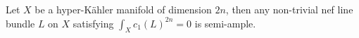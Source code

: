 \documentclass[a4paper, twoside]{article}
\begin{document}
\begin{cnj}
	Let $X$ be a hyper-K{\"a}hler manifold of dimension $2n$, then any non-trivial nef line bundle $L$ on $X$ satisfying $\int_{X}c_{1}(L)^{2n}=0$ is semi-ample.
\end{cnj}





\ifmain
    
    
\fi
\end{document}
